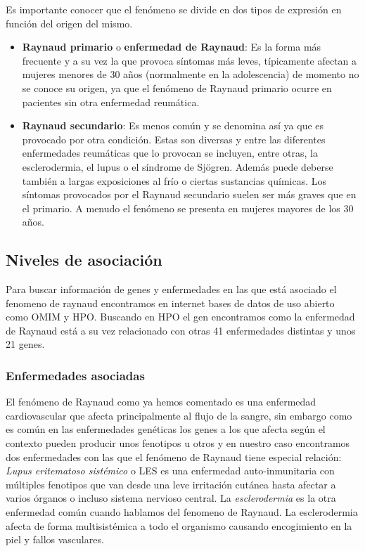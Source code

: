 Es importante conocer que el fenómeno se divide en dos tipos de expresión en función del origen del mismo.
\begin{itemize}
	\item \textbf{Raynaud primario} o \textbf{enfermedad de Raynaud}: Es la forma más frecuente y a su vez la que provoca síntomas más leves, típicamente afectan a mujeres menores de 30 años (normalmente en la adolescencia) de momento no se conoce su origen, ya que el fenómeno de Raynaud primario ocurre en pacientes sin otra enfermedad reumática. \cite{RaynaudRheuma}
	
	\item \textbf{Raynaud secundario}: Es menos común y se denomina así ya que es provocado por otra condición. Estas son diversas y entre las diferentes enfermedades reumáticas que lo provocan se incluyen, entre otras, la esclerodermia, el lupus o el síndrome de Sjögren. Además puede deberse también a largas exposiciones al frío o ciertas sustancias químicas. Los síntomas provocados por el Raynaud secundario suelen ser más graves que en el primario. A menudo el fenómeno se presenta en mujeres mayores de los 30 años. \cite{Pauling2019}
\end{itemize}

\subsection{Niveles de asociación}

Para buscar información de genes y enfermedades en las que está asociado el fenomeno de raynaud encontramos en internet bases de datos de uso abierto como OMIM y HPO. Buscando en HPO el gen encontramos como la enfermedad de Raynaud está a su vez relacionado con otras 41 enfermedades distintas y unos 21 genes.

\subsubsection{Enfermedades asociadas}

El fenómeno de Raynaud como ya hemos comentado es una enfermedad cardiovascular que afecta principalmente al flujo de la sangre, sin embargo como es común en las enfermedades genéticas los genes a los que afecta según el contexto pueden producir unos fenotipos u otros y en nuestro caso encontramos dos enfermedades con las que el fenómeno de Raynaud tiene especial relación: \textit{Lupus eritematoso sistémico} \cite{Kuhn2022} o LES es una enfermedad auto-inmunitaria con múltiples fenotipos que van desde una leve irritación cutánea hasta afectar a varios órganos o incluso sistema nervioso central. La \textit{esclerodermia} \cite{Mohameden2022} es la otra enfermedad común cuando hablamos del fenomeno de Raynaud. La esclerodermia afecta de forma multisistémica a todo el organismo causando encogimiento en la piel y fallos vasculares.
	

